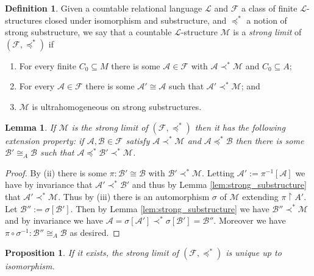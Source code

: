\documentclass[12pt]{amsart}
\theoremstyle{plain}
\newtheorem{lemma}[theorem]{Lemma}
\newtheorem{proposition}[theorem]{Proposition}
\theoremstyle{definition}
\newtheorem{definition}[theorem]{Definition}
\newcommand{\isom}{\cong}
\newcommand{\mcA}{\mathcal{A}}
\newcommand{\mcB}{\mathcal{B}}
\newcommand{\mcF}{\mathcal{F}}
\newcommand{\mcL}{\mathcal{L}}
\newcommand{\mcM}{\mathcal{M}}
\begin{document}
\begin{definition}\label{def:strong_limit}
Given a countable relational language $\mcL$ and $\mcF$ a class of finite $\mcL$-structures closed under isomorphism and substructure, and $\preceq^*$ a notion of strong substructure, we say that a countable $\mcL$-structure $\mcM$ is a \emph{strong limit} of $(\mcF, \preceq^*)$ if
\begin{enumerate}
\item[(i)] For every finite $C_0 \subseteq M$ there is some $\mcA \in \mcF$ with $\mcA \prec^* \mcM$ and $C_0 \subseteq A$;
\item[(ii)] For every $\mcA \in \mcF$ there is some $\mcA' \isom \mcA$ such that $\mcA' \prec^* \mcM$; and
\item[(iii)] $\mcM$ is ultrahomogeneous on strong substructures.
\end{enumerate}
\end{definition}

\begin{lemma}\label{lem:extension_property}
If $\mcM$ is the strong limit of $(\mcF, \preceq^*)$ then it has the following \emph{extension property}: if $\mcA, \mcB \in \mcF$ satisfy $\mcA \prec^* \mcM$ and $\mcA \preceq^* \mcB$ then there is some $\mcB' \isom_A \mcB$ such that $\mcA \preceq^* \mcB' \prec^* \mcM$. 
\end{lemma}

\begin{proof}
By (ii) there is some $\pi : \mcB' \isom \mcB$ with $\mcB' \prec^* \mcM$.
Letting $\mcA' := \pi^{-1}[\mcA]$ we have by invariance that $\mcA' \prec^* \mcB'$ and thus by Lemma \ref{lem:strong_substructure} that $\mcA' \prec^* \mcM$.
Thus by (iii) there is an automorphism $\sigma$ of $\mcM$ extending $\pi \upharpoonright A'$.
Let $\mcB'' := \sigma[\mcB']$.
Then by Lemma \ref{lem:strong_substructure} we have $\mcB'' \prec^* \mcM$ and by invariance we have $\mcA = \sigma[\mcA'] \prec^* \sigma[\mcB'] = \mcB''$.
Moreover we have $\pi \circ \sigma^{-1} : \mcB'' \isom_{A} \mcB$ as desired.
\end{proof}

\begin{proposition}\label{prop:unique_limit}
If it exists, the strong limit of $(\mcF, \preceq^*)$ is unique up to isomorphism.
\end{proposition}
\end{document}
